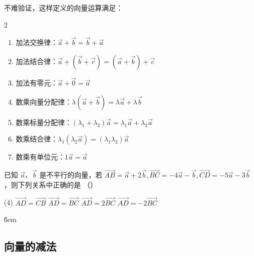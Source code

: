 \begin{theorem}[运算律]
    不难验证，这样定义的向量运算满足：
    \begin{multicols}{2}
        \begin{enumerate}
            \item 加法交换律：$\overrightarrow{a}+\overrightarrow{b} = \overrightarrow{b}+\overrightarrow{a}$
            \item 加法结合律：$\overrightarrow{a}+(\overrightarrow{b}+\overrightarrow{c}) = (\overrightarrow{a}+\overrightarrow{b})+\overrightarrow{c}$
            \item 加法有零元：$\overrightarrow{a}+\overrightarrow{0} = \overrightarrow{a}$
                  \columnbreak
            \item 数乘向量分配律：$\lambda(\overrightarrow{a}+\overrightarrow{b}) = \lambda\overrightarrow{a}+\lambda\overrightarrow{b}$
            \item 数乘标量分配律：$(\lambda_1+\lambda_2)\overrightarrow{a} = \lambda_1\overrightarrow{a}+\lambda_2\overrightarrow{a}$
            \item 数乘结合律：$\lambda_1 (\lambda_2\overrightarrow{a}) = (\lambda_1\lambda_2)\overrightarrow{a}$
            \item 数乘有单位元：$1 \overrightarrow{a} = \overrightarrow{a}$
        \end{enumerate}
    \end{multicols}
\end{theorem}

\begin{example}
    已知 $\overrightarrow{a}$、$\overrightarrow{b}$ 是不平行的向量，若 $\overrightarrow{A B}=\overrightarrow{a}+2 \overrightarrow{b}, \overrightarrow{B C}=-4 \overrightarrow{a}-\overrightarrow{b}, \overrightarrow{C D}=-5 \overrightarrow{a}-3 \overrightarrow{b}$ ，则下列关系中正确的是 （\qquad）
    \begin{tasks}(4)
        \task $\overrightarrow{A D}=\overrightarrow{C B}$
        \task $\overrightarrow{A D}=\overrightarrow{B C}$
        \task $\overrightarrow{A D}=2 \overrightarrow{B C}$
        \task $\overrightarrow{A D}=-2 \overrightarrow{B C}$
    \end{tasks}
\end{example}

\v{6em}

\subsection{向量的减法}

